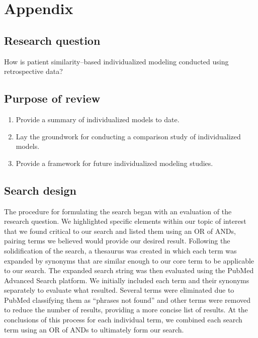 \documentclass[preprint, 3p,
authoryear]{elsarticle} %
\providecommand{\tightlist}{%
  \setlength{\itemsep}{0pt}\setlength{\parskip}{0pt}}
\begin{document}
\hypertarget{appendix}{%
\section{Appendix}\label{appendix}}

\hypertarget{research-question}{%
\subsection{Research question}\label{research-question}}

How is patient similarity--based individualized modeling conducted using
retrospective data?

\hypertarget{purpose-of-review}{%
\subsection{Purpose of review}\label{purpose-of-review}}

\begin{enumerate}
\def\labelenumi{\arabic{enumi}.}
\tightlist
\item
  Provide a summary of individualized models to date.
\item
  Lay the groundwork for conducting a comparison study of individualized
  models.
\item
  Provide a framework for future individualized modeling studies.
\end{enumerate}

\hypertarget{search-design}{%
\subsection{Search design}\label{search-design}}

The procedure for formulating the search began with an evaluation of the
research question. We highlighted specific elements within our topic of
interest that we found critical to our search and listed them using an
OR of ANDs, pairing terms we believed would provide our desired result.
Following the solidification of the search, a thesaurus was created in
which each term was expanded by synonyms that are similar enough to our
core term to be applicable to our search. The expanded search string was
then evaluated using the PubMed Advanced Search platform. We initially
included each term and their synonyms separately to evaluate what
resulted. Several terms were eliminated due to PubMed classifying them
as ``phrases not found'' and other terms were removed to reduce the
number of results, providing a more concise list of results. At the
conclusions of this process for each individual term, we combined each
search term using an OR of ANDs to ultimately form our search.
\end{document}
